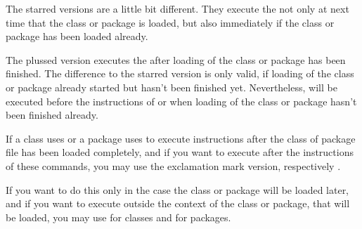 The starred versions
are a little bit different. They execute the  not only at
next time that the class or package is loaded, but also immediately if the
class or package has been loaded already.

The
plussed version executes the
 after loading of the class or package has been
finished. The difference to the starred version is only valid, if loading of
the class or package already started but hasn't been finished
yet. Nevertheless,  will be executed before the
instructions of  or  when loading of
the class or package hasn't been finished already.

If a class uses
 or a package uses  to execute
instructions after the class of package file has been loaded completely, and
if you want to execute  after the instructions of these
commands, you may use the exclamation mark version,
 respectively
.

If you
want to do this only in the case the class or package will be loaded later,
and if you want to execute  outside the context of the
class or package, that will be loaded, you may use
 for classes and
 for packages.

